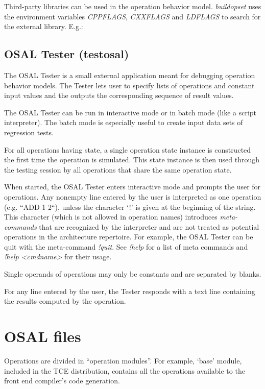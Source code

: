 \documentclass[twoside]{tceusermanual}
\begin{document}
Third-party libraries can be used in the operation behavior model.
\emph{buildopset} uses the environment variables \emph{CPPFLAGS}, 
\emph{CXXFLAGS} and \emph{LDFLAGS} to search for the external library. E.g.: 



\subsection{OSAL Tester (testosal)}
\label{sec:testosal}

The OSAL Tester is a small external application meant for debugging 
operation behavior models.  The Tester lets user to specify lists of
operations and constant input values and the outputs the corresponding sequence
of result values.

The OSAL Tester can be run in interactive mode or in batch mode (like a
script interpreter).  The batch mode is especially useful to create input
data sets of regression tests.

For all operations having state, a single operation state instance is
constructed the first time the operation is simulated. This state instance
is then used through the testing session by all operations that share the
same operation state.

When started, the OSAL Tester enters interactive mode and prompts the user
for operations. Any nonempty line entered by the user is interpreted as one
operation (e.g. ``ADD 1 2``), unless the character `!' is given at the beginning of 
the string. This character (which is not allowed in operation names) introduces
\emph{meta-commands} that are recognized by the interpreter and are not
treated as potential operations in the architecture repertoire. For example, the
OSAL Tester can be quit with the meta-command \textit{!quit}. See \textit{!help}
for a list of meta commands and \textit{!help <cmdname>} for their usage.

Single operands of operations may only be constants and are separated by
blanks.

For any line entered by the user, the Tester responds with a text line
containing the results computed by the operation.


\section{OSAL files}
\label{section:osal_details}
Operations are divided in ``operation modules''. For example, `base' module,
included in the TCE distribution, contains all the operations available 
to the front end compiler's code generation.
\end{document}
